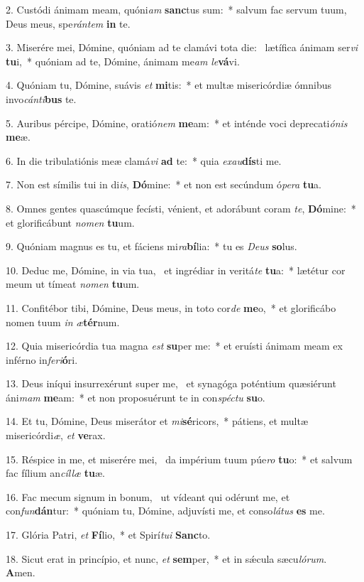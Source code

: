 2. Custódi ánimam meam, quóni\textit{am} \textbf{sanc}tus sum:~*  salvum fac servum tuum, Deus meus, spe\textit{rán}\textit{tem} \textbf{in} te.\

3. Miserére mei, Dómine, quóniam ad te clamávi tota die: \dag\  lætífica ánimam ser\textit{vi} \textbf{tu}i,~*  quóniam ad te, Dómine, ánimam me\textit{am} \textit{le}\textbf{vá}vi.\

4. Quóniam tu, Dómine, suávis \textit{et} \textbf{mi}tis:~*  et multæ misericórdiæ ómnibus invo\textit{cán}\textit{ti}\textbf{bus} te.\

5. Auribus pércipe, Dómine, oratió\textit{nem} \textbf{me}am:~*  et inténde voci deprecati\textit{ó}\textit{nis} \textbf{me}æ.\

6. In die tribulatiónis meæ clamá\textit{vi} \textbf{ad} te:~*  quia \textit{ex}\textit{au}\textbf{dís}ti me.\

7. Non est símilis tui in di\textit{is}, \textbf{Dó}mine:~*  et non est secúndum ó\textit{pe}\textit{ra} \textbf{tu}a.\

8. Omnes gentes quascúmque fecísti, vénient, et adorábunt coram \textit{te}, \textbf{Dó}mine:~*  et glorificábunt \textit{no}\textit{men} \textbf{tu}um.\

9. Quóniam magnus es tu, et fáciens mi\textit{ra}\textbf{bí}lia:~*  tu es \textit{De}\textit{us} \textbf{so}lus.\

10. Deduc me, Dómine, in via tua, \dag\  et ingrédiar in veritá\textit{te} \textbf{tu}a:~*  lætétur cor meum ut tímeat \textit{no}\textit{men} \textbf{tu}um.\

11. Confitébor tibi, Dómine, Deus meus, in toto cor\textit{de} \textbf{me}o,~*  et glorificábo nomen tuum \textit{in} \textit{æ}\textbf{tér}num.\

12. Quia misericórdia tua magna \textit{est} \textbf{su}per me:~*  et eruísti ánimam meam ex inférno in\textit{fe}\textit{ri}\textbf{ó}ri.\

13. Deus iníqui insurrexérunt super me, \dag\  et synagóga poténtium quæsiérunt áni\textit{mam} \textbf{me}am:~*  et non proposuérunt te in con\textit{spéc}\textit{tu} \textbf{su}o.\

14. Et tu, Dómine, Deus miserátor et \textit{mi}\textbf{sé}ricors,~*  pátiens, et multæ misericórdi\textit{æ}, \textit{et} \textbf{ve}rax.\

15. Réspice in me, et miserére mei, \dag\  da impérium tuum púe\textit{ro} \textbf{tu}o:~*  et salvum fac fílium an\textit{cíl}\textit{læ} \textbf{tu}æ.\

16. Fac mecum signum in bonum, \dag\  ut vídeant qui odérunt me, et con\textit{fun}\textbf{dán}tur:~*  quóniam tu, Dómine, adjuvísti me, et conso\textit{lá}\textit{tus} \textbf{es} me.\

17. Glória Patri, \textit{et} \textbf{Fí}lio,~*  et Spirí\textit{tu}\textit{i} \textbf{Sanc}to.\

18. Sicut erat in princípio, et nunc, \textit{et} \textbf{sem}per,~*  et in sǽcula sæcu\textit{ló}\textit{rum}. \textbf{A}men.\

